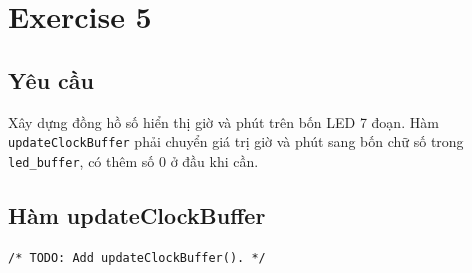 \section{Exercise 5}

\subsection{Yêu cầu}
Xây dựng đồng hồ số hiển thị giờ và phút trên bốn LED 7 đoạn. Hàm
\texttt{updateClockBuffer} phải chuyển giá trị giờ và phút sang bốn chữ số trong
\texttt{led\_buffer}, có thêm số 0 ở đầu khi cần.

\subsection{Hàm updateClockBuffer}
\begin{lstlisting}[caption={updateClockBuffer -- Exercise 5}]
/* TODO: Add updateClockBuffer(). */
\end{lstlisting}

